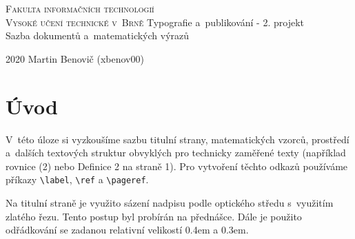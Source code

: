 \documentclass[twocolumn, a4paper, 11pt]{article}
\theoremstyle{definition}
\begin{document}
\begin{titlepage}
    \begin{center}
        \Huge
        \textsc{Fakulta informačních technologií\\Vysoké učení technické v~Brně}
        \vfill
        Typografie a~publikování - 2. projekt\\
        Sazba dokumentů a~matematických výrazů
        \vfill
    \end{center}
    {\LARGE 2020 \hfill Martin Benovič (xbenov00)}
    \thispagestyle{empty}
    \newpage
\end{titlepage}



\section*{Úvod}
V~této úloze si vyzkoušíme sazbu titulní strany, matematických vzorců, prostředí a~dalších textových struktur obvyklých pro technicky zaměřené texty (například rovnice (2)
nebo Definice 2 na straně 1). Pro vytvoření těchto odkazů používáme příkazy \verb|\label|, \verb|\ref| a \verb|\pageref|.\par
Na titulní straně je využito sázení nadpisu podle optického středu s~využitím zlatého řezu. Tento postup byl
probírán na přednášce. Dále je použito odřádkování se
zadanou relativní velikostí 0.4em a 0.3em.
\end{document}
